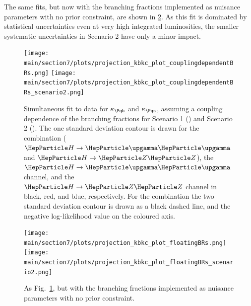 \documentclass[../report.tex]{subfiles}
\providecommand{\main}{..}
\begin{document}
The same fits, but now with the branching fractions implemented as nuisance parameters with no prior constraint, are shown in \ref{fig:kbkc_floatingBRs}.
% 
As this fit is dominated by statistical uncertainties even at very high integrated luminosities, the smaller systematic uncertainties in Scenario 2 have only a minor impact.



\begin{figure}[hbtp]
  \begin{center}
    \texttt{[image: \\main/section7/plots/projection\_kbkc\_plot\_couplingdependentBRs.png]}
    \texttt{[image: \\main/section7/plots/projection\_kbkc\_plot\_couplingdependentBRs\_scenario2.png]}
    \caption{
        Simultaneous fit to data for $\kappab$ and $\kappac$, assuming a coupling dependence of the branching fractions for Scenario 1 (\UcmsLeft) and Scenario 2 (\UcmsRight).
        The one standard deviation contour is drawn for the combination ($\hgg$ and $\hzz$), the $\hgg$ channel, and the $\hzz$ channel in black, red, and blue, respectively.
        For the combination the two standard deviation contour is drawn as a black dashed line, and the negative log-likelihood value on the coloured axis.
        }
    \label{fig:kbkc_couplingdependentBRs}
  \end{center}
\end{figure}

\begin{figure}[hbtp]
  \begin{center}
    \texttt{[image: \\main/section7/plots/projection\_kbkc\_plot\_floatingBRs.png]}
    \texttt{[image: \\main/section7/plots/projection\_kbkc\_plot\_floatingBRs\_scenario2.png]}
    \caption{
        As Fig.~\ref{fig:kbkc_couplingdependentBRs}, but with the branching fractions implemented as nuisance parameters with no prior constraint.
        }
    \label{fig:kbkc_floatingBRs}
  \end{center}
\end{figure}
\end{document}
